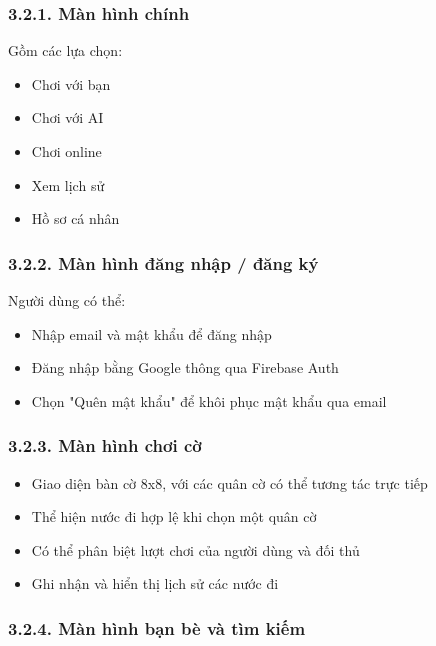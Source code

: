 \documentclass[a4paper,12pt]{article}
\begin{document}
\subsubsection*{3.2.1. Màn hình chính} %

\noindent Gồm các lựa chọn:
\begin{itemize}[label=·]
    \item Chơi với bạn
    \item Chơi với AI
    \item Chơi online
    \item Xem lịch sử
    \item Hồ sơ cá nhân
\end{itemize}

\subsubsection*{3.2.2. Màn hình đăng nhập / đăng ký} %

\noindent Người dùng có thể:
\begin{itemize}[label=·]
    \item Nhập email và mật khẩu để đăng nhập
    \item Đăng nhập bằng Google thông qua Firebase Auth
    \item Chọn "Quên mật khẩu" để khôi phục mật khẩu qua email
\end{itemize}

\subsubsection*{3.2.3. Màn hình chơi cờ} %

\noindent \begin{itemize}[label=·]
    \item Giao diện bàn cờ 8x8, với các quân cờ có thể tương tác trực tiếp
    \item Thể hiện nước đi hợp lệ khi chọn một quân cờ
    \item Có thể phân biệt lượt chơi của người dùng và đối thủ 
    \item Ghi nhận và hiển thị lịch sử các nước đi
\end{itemize}

\subsubsection*{3.2.4. Màn hình bạn bè và tìm kiếm} %
\end{document}
